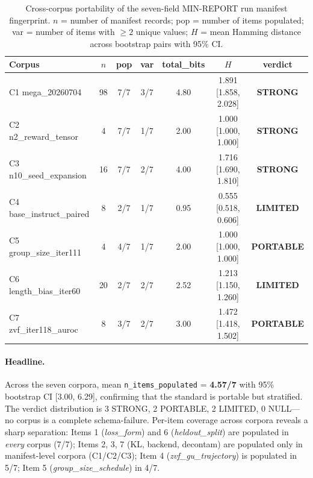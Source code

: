 \begin{table}[t]
\centering
\caption{Cross-corpus portability of the seven-field MIN-REPORT run manifest
fingerprint. $n$ = number of manifest records; pop = number of
items populated; var = number of items with $\geq 2$ unique values;
$H$ = mean Hamming distance across bootstrap pairs with 95\% CI.}
\label{tab:p5-cross-corpus}
\small
\begin{tabular}{@{}lcccccc@{}}
\toprule
Corpus & $n$ & pop & var & total\_bits & $H$ & verdict \\
\midrule
C1 mega\_20260704            &  98 & 7/7 & 3/7 & 4.80 & 1.891 [1.858, 2.028] & \textbf{STRONG} \\
C2 n2\_reward\_tensor         &   4 & 7/7 & 1/7 & 2.00 & 1.000 [1.000, 1.000] & \textbf{STRONG} \\
C3 n10\_seed\_expansion       &  16 & 7/7 & 2/7 & 4.00 & 1.716 [1.690, 1.810] & \textbf{STRONG} \\
C4 base\_instruct\_paired     &   8 & 2/7 & 1/7 & 0.95 & 0.555 [0.518, 0.606] & \textbf{LIMITED} \\
C5 group\_size\_iter111       &   4 & 4/7 & 1/7 & 2.00 & 1.000 [1.000, 1.000] & \textbf{PORTABLE} \\
C6 length\_bias\_iter60       &  20 & 2/7 & 2/7 & 2.52 & 1.213 [1.150, 1.260] & \textbf{LIMITED} \\
C7 zvf\_iter118\_auroc        &   8 & 3/7 & 2/7 & 3.00 & 1.472 [1.418, 1.502] & \textbf{PORTABLE} \\
\bottomrule
\end{tabular}
\end{table}

\paragraph{Headline.}
Across the seven corpora, mean \texttt{n\_items\_populated} =
\textbf{4.57/7} with 95\% bootstrap CI [3.00, 6.29], confirming that
the standard is portable but stratified. The verdict distribution is
3 STRONG, 2 PORTABLE, 2 LIMITED, 0 NULL---no corpus is a complete
schema-failure. Per-item coverage across corpora reveals a sharp
separation: Items 1 (\textit{loss\_form}) and 6
(\textit{heldout\_split}) are populated in \emph{every} corpus
(7/7); Items 2, 3, 7 (KL, backend, decontam) are populated only in
manifest-level corpora (C1/C2/C3); Item 4 (\textit{zvf\_gu\_trajectory})
is populated in 5/7; Item 5 (\textit{group\_size\_schedule}) in 4/7.

